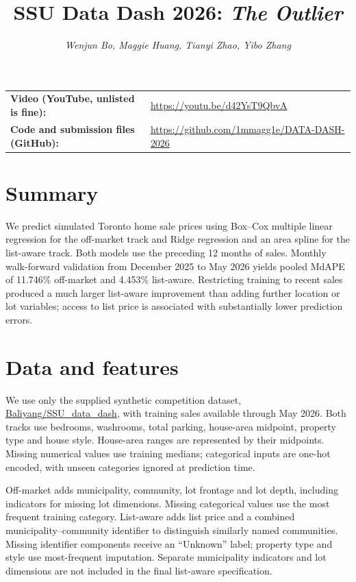 \documentclass[11pt]{article}
\title{SSU Data Dash 2026: \textit{The Outlier}}
\author{\textit{Wenjun Bo, Maggie Huang, Tianyi Zhao, Yibo Zhang}}
\date{}
\begin{document}
\maketitle

\noindent\begin{tabular}{@{}ll}
\textbf{Video (YouTube, unlisted is fine):} & \url{https://youtu.be/d42YsT9QbvA} \\
\textbf{Code and submission files (GitHub):} & \url{https://github.com/1mmagg1e/DATA-DASH-2026} \\
\end{tabular}

\section*{Summary}
We predict simulated Toronto home sale prices using Box--Cox multiple linear regression for the off-market track and Ridge regression and an area spline for the list-aware track. Both models use the preceding 12 months of sales. Monthly walk-forward validation from December 2025 to May 2026 yields pooled MdAPE of 11.746\% off-market and 4.453\% list-aware. Restricting training to recent sales produced a much larger list-aware improvement than adding further location or lot variables; access to list price is associated with substantially lower prediction errors.

\section{Data and features}
We use only the supplied synthetic competition dataset, \href{https://huggingface.co/datasets/Baliyang/SSU_data_dash}{Baliyang/SSU\_data\_dash}, with training sales available through May 2026. Both tracks use bedrooms, washrooms, total parking, house-area midpoint, property type and house style. House-area ranges are represented by their midpoints. Missing numerical values use training medians; categorical inputs are one-hot encoded, with unseen categories ignored at prediction time.

Off-market adds municipality, community, lot frontage and lot depth, including indicators for missing lot dimensions. Missing categorical values use the most frequent training category. List-aware adds list price and a combined municipality--community identifier to distinguish similarly named communities. Missing identifier components receive an ``Unknown'' label; property type and style use most-frequent imputation. Separate municipality indicators and lot dimensions are not included in the final list-aware specification.
\end{document}

